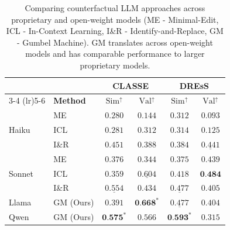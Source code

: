 \documentclass[letterpaper]{article} %
\begin{document}
\begin{table}[t]
\small
\centering
\setlength{\tabcolsep}{4pt}
\begin{tabular}{ll  cc  cc}
\toprule
& & \multicolumn{2}{c}{\textbf{CLASSE}} & \multicolumn{2}{c}{\textbf{DREsS}} \\
\cmidrule(lr){3-4} \cmidrule(lr){5-6}
\multirow{-2}{*}{\textbf{Model}} & \multirow{-2}{*}{\textbf{Method}} & $\text{Sim}^\uparrow$ & $\text{Val}^\uparrow$ & $\text{Sim}^\uparrow$ & $\text{Val}^\uparrow$ \\
\midrule
\multirow{3}{*}{Haiku}
  & ME %
    & $0.280$ & $0.144$
    & $0.312$ & $0.093$ \\
  & ICL
    & $0.281$ & $0.312$
    & $0.314$ & $0.125$ \\
  & I\&R %
    & $0.451$ & $0.388$
    & $0.384$ & $\underline{0.441}$ \\
\midrule
\multirow{3}{*}{Sonnet}
  & ME %
    & $0.376$ & $0.344$
    & $0.375$ & $0.439$ \\
  & ICL
    & $0.359$ & $\underline{0.604}$
    & $0.418$ & $\textbf{0.484}$ \\
  & I\&R %
    & $\underline{0.554}$ & $0.434$
    & $\underline{0.477}$ & $0.405$ \\
\midrule
\multirow{1}{*}{Llama}
 & GM (Ours)
    & $0.391$ & $\textbf{0.668}^{*}$
    & $\underline{0.477}$ & $0.404$ \\
\midrule
\multirow{1}{*}{Qwen}
  & GM (Ours)
    & $\textbf{0.575}^{*}$ & $0.566$
    & $\textbf{0.593}^{*}$ & $0.315$ \\
\bottomrule
\end{tabular}
\caption{Comparing counterfactual LLM approaches across proprietary and open-weight models (ME - Minimal-Edit, ICL - In-Context Learning, I\&R - Identify-and-Replace, GM - Gumbel Machine). GM translates across open-weight models and has comparable performance to larger proprietary models.}
\label{tab:gm_vs_closed}
\end{table}
\end{document}
